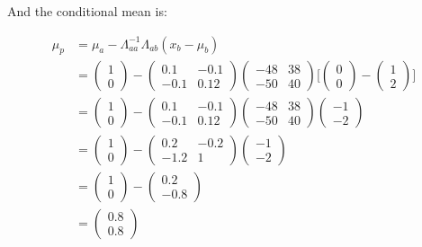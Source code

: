 \documentclass[a4paper]{article}
\begin{document}
And the conditional mean is:

\begin{align*}
 	\mu_p &= \mu_a - \Lambda^{-1}_{aa} \Lambda_{ab} (x_b - \mu_b)\\
 	&= \begin{pmatrix}1 \\ 0 \end{pmatrix}  - 
\begin{pmatrix} 0.1 & -0.1 \\-0.1 & 0.12 \end{pmatrix} \begin{pmatrix} -48 & 38 \\-50 & 40\end{pmatrix}
\Bigg[\begin{pmatrix}0 \\ 0\end{pmatrix} - \begin{pmatrix}1 \\ 2\end{pmatrix}\Bigg] \\
&= \begin{pmatrix}1 \\ 0 \end{pmatrix}  - \begin{pmatrix} 0.1 & -0.1 \\-0.1 & 0.12 \end{pmatrix} \begin{pmatrix} -48 & 38 \\-50 & 40\end{pmatrix} \begin{pmatrix}-1 \\ -2 \end{pmatrix}\\
&= \begin{pmatrix}1 \\ 0 \end{pmatrix}  - \begin{pmatrix} 0.2 & -0.2 \\-1.2 & 1 \end{pmatrix}  \begin{pmatrix}-1 \\ -2 \end{pmatrix}\\
&= \begin{pmatrix}1 \\ 0 \end{pmatrix}  -  \begin{pmatrix}0.2 \\ -0.8 \end{pmatrix}\\
&= \begin{pmatrix}0.8 \\ 0.8 \end{pmatrix}
\end{align*}
\end{document}
